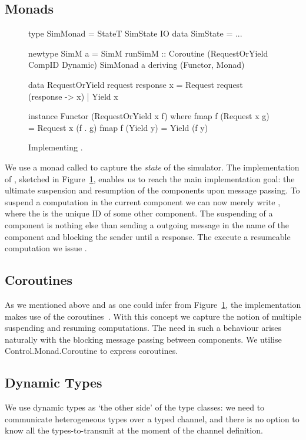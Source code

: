 \subsection{Monads}
\label{sec:impl-monads}
\begin{figure}
\begin{code}
type SimMonad  =  StateT SimState IO
data SimState  = ...

newtype SimM a
  = SimM { runSimM ::
               Coroutine
                 (RequestOrYield CompID Dynamic)
                 SimMonad
                 a
         }
    deriving (Functor, Monad)

data RequestOrYield request response x
  =  Request request (response -> x)
  |  Yield   x

instance Functor (RequestOrYield x f) where
  fmap f (Request x g)  = Request x (f . g)
  fmap f (Yield y)      = Yield (f y)
\end{code}
\caption{Implementing .}
\label{fig:code-simm}
\end{figure}

We use a monad called  to capture the \emph{state} of the simulator.
The implementation of , sketched in Figure~\ref{fig:code-simm}, enables us to reach the main implementation goal: the ultimate suspension and resumption of the components upon message passing.
To suspend a computation in the current component we can now merely write , where the  is the unique ID of some other component.
The suspending of a component is nothing else than sending a outgoing message in the name of the component and blocking the sender until a response.
The execute a resumeable computation we issue  \mbox{.} %


\subsection{Coroutines}
\label{sec:impl-coroutines}
As we mentioned above and as one could infer from Figure~\ref{fig:code-simm}, the implementation makes use of the coroutines~\cite{coroutines}.
With this concept we capture the notion of multiple suspending and resuming computations.
The need in such a behaviour arises naturally with the blocking message passing between components.
We utilise \textsf{Control.Monad.Coroutine} \cite{cmt} to express coroutines.

\subsection{Dynamic Types}
We use dynamic types \cite{Abadi:1991:DTS:103135.103138} as `the other side' of the type classes: we need to communicate heterogeneous types over a typed channel, and there is no option to know all the types-to-transmit at the moment of the channel definition.

